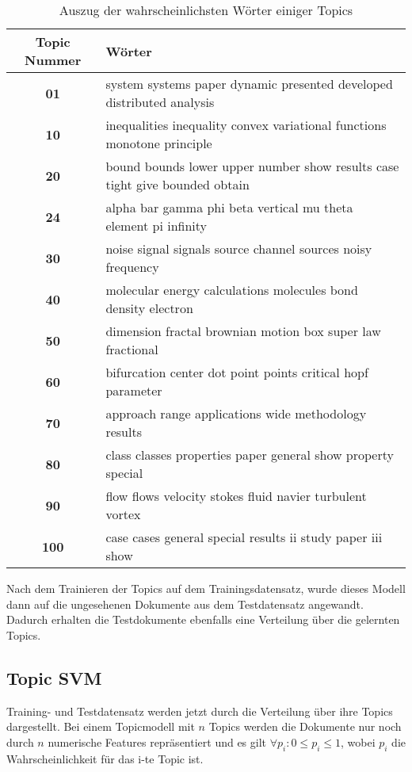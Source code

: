 \begin{table}[h]
    \centering
    \begin{tabular}{c|l}
        \small \textbf{Topic Nummer} & \small\textbf{Wörter}\\
        \hline
        \small \textbf{01} & \small system systems paper dynamic presented developed distributed analysis\\
        \small \textbf{10} & \small inequalities inequality convex variational functions monotone principle\\
        \small \textbf{20} & \small bound bounds lower upper number show results case tight give bounded obtain \\
        \small \textbf{24} & \small alpha bar gamma phi beta vertical mu theta element pi infinity \\
        \small \textbf{30} & \small noise signal signals source channel sources noisy frequency \\
        \small \textbf{40} & \small molecular energy calculations molecules bond density electron \\
        \small \textbf{50} & \small dimension fractal brownian motion box super law fractional \\
        \small \textbf{60} & \small bifurcation center dot point points critical hopf parameter \\
        \small \textbf{70} & \small approach range applications wide methodology results \\
        \small \textbf{80} & \small class classes properties paper general show property special \\
        \small \textbf{90} & \small flow flows velocity stokes fluid navier turbulent vortex \\
        \small \textbf{100}& \small case cases general special results ii study paper iii show
    \end{tabular}
    \caption{Auszug der wahrscheinlichsten Wörter einiger Topics}
    \label{tab:topics_words}
\end{table}

Nach dem Trainieren der Topics auf dem Trainingsdatensatz, wurde dieses Modell dann auf die ungesehenen Dokumente aus
dem Testdatensatz angewandt.
Dadurch erhalten die Testdokumente ebenfalls eine Verteilung über die gelernten Topics.

\subsection{Topic SVM}
\label{sub:topic_svm}
Training- und Testdatensatz werden jetzt durch die Verteilung über ihre Topics dargestellt.
Bei einem Topicmodell mit $n$ Topics
werden die Dokumente nur noch durch $n$ numerische Features repräsentiert und es gilt $\forall p_i: 0 \le p_i \le 1 $, wobei $p_i$
die Wahrscheinlichkeit für das i-te Topic ist.


